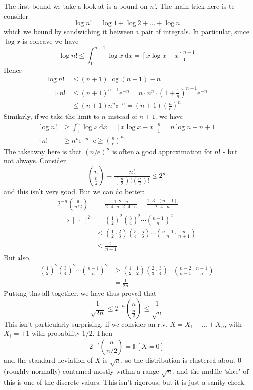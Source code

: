 \documentclass[]{article}
\theoremstyle{custhm}
\theoremstyle{cusdef}
\theoremstyle{custhm}
\theoremstyle{custhm}
\theoremstyle{custhm}
\theoremstyle{custhm}
\theoremstyle{cusdef}
\theoremstyle{remark}
\newcommand{\e}{\mathrm{e}}
\renewcommand{\P}{\mathbb{P}}
\begin{document}
The first bound we take a look at is a bound on $n!$. The main trick here is to consider
\[
\log n! = \log 1 + \log 2 + \dots + \log n
\]
which we bound by sandwiching it between a pair of integrals. In particular, since $\log x$ is concave we have
\[
\log n! \le \int_{1}^{n+1}\log x\ \textrm{d}x = [x\log x - x]_{1}^{n+1}
\]
Hence
\begin{align*}
\log n! &\le (n+1)\log(n+1) - n\\
\implies n! &\le (n+1)^{n+1}\e^{-n}= n\cdot n^n\cdot\left(1+\frac{1}{n}\right)^{n+1}\e^{-n}\\
&\le (n+1)n^n\e^{-n} = (n+1)\left(\frac{n}{e}\right)^n
\end{align*}
Similarly, if we take the limit to $n$ instead of $n+1$, we have
\begin{align*}
\log n! &\ge \int_{1}^{n}\log x\ \textrm{d}x = [x\log x - x]_{1}^{n} = n\log n - n + 1\\
\therefore n! &\ge n^n\e^{-n}\cdot \e \ge \left(\frac{n}{e}\right)^n 
\end{align*}
The takeaway here is that $(n/e)^n$ is often a good approximation for $n!$ - but not always. Consider
\[
\binom{n}{\frac{n}{2}}  = \frac {n!}{\left(\frac{n}{2}\right)!\left(\frac{n}{2}\right)!}\le 2^n
\]
and this isn't very good. But we can do better:
\begin{align*}
2^{-n}\binom{n}{n/2} &= \frac{1\cdot 2\cdots n}{2\cdot 4\cdots n\cdot 2\cdot 4\cdots n} = \frac{1\cdot3\cdots (n-1)}{2\cdot 4\cdots n}\\
\implies [\ \cdot\ ]^2 &= \left(\frac{1}{2}\right)^2\left(\frac{3}{4}\right)^2\cdots\left(\frac{n-1}{n}\right)^2\\
&\le \left(\frac{1}{2}\cdot\frac{2}{3}\right)\left(\frac{3}{4}\cdot\frac{5}{6}\right)\cdots\left(\frac{n-1}{n}\cdot\frac{n}{n+1}\right)\\
&\le \frac{1}{n+1}
\end{align*}
But also,
\begin{align*}
\left(\frac{1}{2}\right)^2\left(\frac{3}{4}\right)^2\cdots\left(\frac{n-1}{n}\right)^2 &\ge \left(\frac{1}{2}\cdot\frac{1}{2}\right)\left(\frac{2}{3}\cdot\frac{3}{4}\right)\cdots\left(\frac{n-2}{n-1}\cdot\frac{n-1}{n}\right)\\
&= \frac{1}{2n}
\end{align*}
Putting this all together, we have thus proved that
\[
\frac{1}{\sqrt{2n}} \le 2^{-n}\binom{n}{\frac{n}{2}} \le \frac{1}{\sqrt{n}}
\]
This isn't particularly surprising, if we consider an r.v. $X = X_1+\dots + X_n$, with $X_i = \pm 1$ with probability $1/2$. Then
\[
2^{-n}\binom{n}{n/2} = \P[X = 0]
\]
and the standard deviation of $X$ is $\sqrt{n}$, so the distribution is clustered about $0$ (roughly normally) contained mostly within a range $\sqrt{n}$, and the middle `slice' of this is one of the discrete values. This isn't rigorous, but it is just a sanity check.
\end{document}
